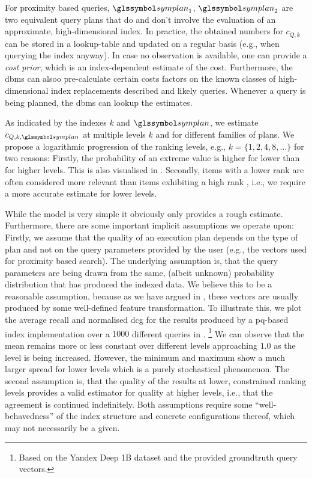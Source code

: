 For proximity based queries, $\symplan_1$, $\symplan_2$ are two equivalent query plans that do and don't involve the evaluation of an approximate, high-dimensional index. In practice, the obtained numbers for $c_{Q,k}$ can be stored in a lookup-table and updated on a regular basis (e.g., when querying the index anyway). In case no observation is available, one can provide a \emph{cost prior}, which is an index-dependent estimate of the cost. Furthermore, the \acrshort{dbms} can alsoo pre-calculate certain costs factors on the known classes of high-dimensional index replacements described  and likely queries. Whenever a query is being planned, the \acrshort{dbms} can lookup the estimates.

As indicated by the indexes $k$ and $\symplan$, we estimate $c_{Q,k,\symplan}$ at multiple levels $k$ and for different families of plans. We propose a logarithmic progression of the ranking levels, e.g., $k= \{ 1, 2, 4, 8, \ldots \}$ for two reasons: Firstly, the probability of an extreme value is higher for lower than for higher levels. This is also visualised in . Secondly, items with a lower rank are often considered more relevant than items exhibiting a high rank \cite{Jarvelin:2002Cumulated}, i.e., we require a more accurate estimate for lower levels.

While the model is very simple it obviously only provides a rough estimate. Furthermore, there are some important implicit assumptions we operate upon: Firstly, we assume that the quality of an execution plan depends on the type of plan and not on the query parameters provided by the user (e.g., the vectors used for proximity based search). The underlying assumption is, that the query parameters are being drawn from the same, (albeit unknown) probability distribution that has produced the indexed data. We believe this to be a reasonable assumption, because as we have argued in , these vectors are usually produced by some well-defined feature transformation. To illustrate this, we plot the average recall and normalised \acrshort{dcg} for the results produced by a \acrshort{pq}-based index implementation over a $1000$ different queries in . \footnote{Based on the Yandex Deep 1B dataset \cite{Babenko:2016Efficient} and the provided groundtruth query vectors.} We can observe that the mean remains more or less constant over different levels approaching $1.0$ as the level is being increased. However, the minimum and maximum show a much larger spread for lower levels which is a purely stochastical phenomenon. The second assumption is, that the quality of the results at lower, constrained ranking levels provides a valid estimator for quality at higher levels, i.e., that the agreement is continued indefinitely. Both assumptions require some ``well-behavedness'' of the index structure and concrete configurations thereof, which may not necessarily be a given.

